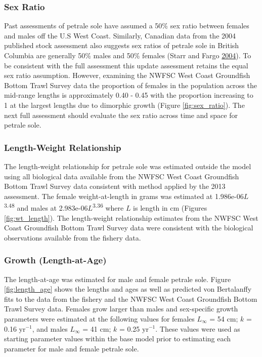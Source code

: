 \documentclass[12pt,]{article}
\begin{document}
\subsubsection{Sex Ratio}\label{sex-ratio}

Past assessments of petrale sole have assumed a 50\% sex ratio between
females and males off the U.S West Coast. Similarly, Canadian data from
the 2004 published stock assessment also suggests sex ratios of petrale
sole in British Columbia are generally 50\% males and 50\% females
(Starr and Fargo \protect\hyperlink{ref-starr_petrale_2004}{2004}). To
be consistent with the full assessment this update assessment retains
the equal sex ratio assumption. However, examining the NWFSC West Coast
Groundfish Bottom Trawl Survey data the proportion of females in the
population across the mid-range lengths is approximately 0.40 - 0.45
with the proportion increasing to 1 at the largest lengths due to
dimorphic growth (Figure \ref{fig:sex_ratio}). The next full assessment
should evaluate the sex ratio across time and space for petrale sole.

\subsubsection{Length-Weight
Relationship}\label{length-weight-relationship}

The length-weight relationship for petrale sole was estimated outside
the model using all biological data available from the NWFSC West Coast
Groundfish Bottom Trawl Survey data consistent with method applied by
the 2013 assessment. The female weight-at-length in grams was estimated
at 1.986e-06\(L\)\textsuperscript{3.48} and males at
2.983e-06\(L\)\textsuperscript{3.36} where \(L\) is length in cm
(Figures \ref{fig:wt_length}). The length-weight relationship estimates
from the NWFSC West Coast Groundfish Bottom Trawl Survey data were
consistent with the biological observations available from the fishery
data.

\subsubsection{Growth (Length-at-Age)}\label{growth-length-at-age}

The length-at-age was estimated for male and female petrale sole. Figure
\ref{fig:length_age} shows the lengths and ages as well as predicted von
Bertalanffy fits to the data from the fishery and the NWFSC West Coast
Groundfish Bottom Trawl Survey data. Females grow larger than males and
sex-specific growth parameters were estimated at the following values
for females \(L_{\infty}\) = 54 cm; \(k\) = 0.16 \(\text{yr}^{-1}\), and
males \(L_{\infty}\) = 41 cm; \(k\) = 0.25 \(\text{yr}^{-1}\). These
values were used as starting parameter values within the base model
prior to estimating each parameter for male and female petrale sole.
\end{document}
